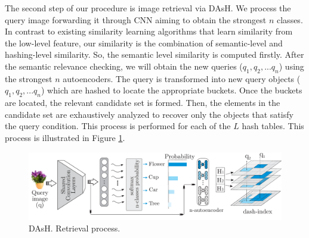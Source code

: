 \documentclass{article}
\begin{document}


The second step of our procedure is image retrieval via  DAsH. We process the query image  forwarding it through CNN aiming to obtain the strongest $n$ classes. In contrast to existing similarity learning algorithms that learn similarity from the low-level feature, our similarity is the combination of semantic-level and hashing-level similarity. So, the semantic level similarity is computed firstly. After the semantic relevance checking, we will obtain the new queries ($q_1, q_2, ... q_n$) using the strongest  $n$ autoencoders. The query is transformed into new query objects ($q_1, q_2, ... q_n$) which are hashed to locate the appropriate buckets. Once the buckets are located, the relevant candidate set is formed.  Then, the elements in the candidate set are exhaustively analyzed to recover only the objects that satisfy the query condition. This process is performed for each of the $L$ hash tables. This process is illustrated in Figure \ref{fig:qdash}.  
\begin{figure}[htp]\centering
\label{fig:qdash}
 \includegraphics[width=1.70\columnwidth]{dash/DAsh_retrieval_final.pdf} 
\caption{ DAsH. Retrieval process. } 
\end{figure}



\end{document}
